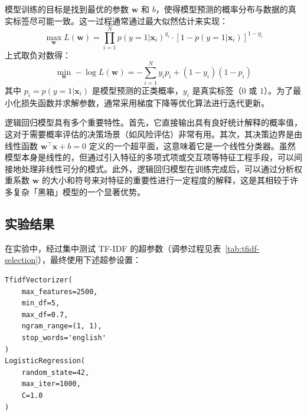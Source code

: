 \documentclass[12pt, a4paper, UTF8]{ctexart}
\begin{document}
模型训练的目标是找到最优的参数 $\boldsymbol{w}$ 和 $b$，使得模型预测的概率分布与数据的真实标签尽可能一致。这一过程通常通过最大似然估计来实现：
$$
\max_{\boldsymbol{w}} L(\boldsymbol{w}) = \prod_{i=1}^{N} p(y=1|\boldsymbol{x}_{i})^{y_{i}} \cdot [1-p(y=1|\boldsymbol{x}_{i})]^{1-y_{i}}
$$
上式取负对数得：
$$
\min_{\boldsymbol{w}} -\log L(\boldsymbol{w}) = -\sum_{i=1}^{N}y_{i}p_{i} + (1-y_{i}) (1-p_{i})
$$
其中 $p_{i}=p(y=1|\boldsymbol{x}_{i})$ 是模型预测的正类概率，$y_{i}$ 是真实标签（$0$ 或 $1$）。为了最小化损失函数并求解参数，通常采用梯度下降等优化算法进行迭代更新。

逻辑回归模型具有多个重要特性。首先，它直接输出具有良好统计解释的概率值，这对于需要概率评估的决策场景（如风险评估）非常有用。其次，其决策边界是由线性函数 $\boldsymbol{w}^{\top} \boldsymbol{x} + b=0$ 定义的一个超平面，这意味着它是一个线性分类器。虽然模型本身是线性的，但通过引入特征的多项式项或交互项等特征工程手段，可以间接地处理非线性可分的模式。此外，逻辑回归模型在训练完成后，可以通过分析权重系数 $\boldsymbol{w}$ 的大小和符号来对特征的重要性进行一定程度的解释，这是其相较于许多复杂「黑箱」模型的一个显著优势。



\subsection{实验结果}
在实验中，经过集中测试 TF-IDF 的超参数（调参过程见表~\ref{tab:tfidf-selection}），最终使用下述超参设置：


\begin{small}
\begin{lstlisting}
TfidfVectorizer(
    max_features=2500,
    min_df=5,
    max_df=0.7,
    ngram_range=(1, 1),
    stop_words='english'
)
LogisticRegression(
    random_state=42,
    max_iter=1000,
    C=1.0
)
\end{lstlisting}
\end{small}
\end{document}
